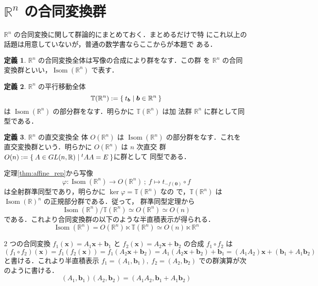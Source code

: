 \documentclass[11pt, uplatex, dvipdfmx, titlepage]{jsarticle}
\DeclareMathOperator{\Isom}{Isom}
\theoremstyle{definition}
\newtheorem*{definition}{定義}
\begin{document}
\section{$\mathbb{R}^n$ の合同変換群}\label{sec:orthogonal}

$\mathbb{R}^n$ の合同変換に関して群論的にまとめておく．まとめるだけで特
にこれ以上の話題は用意していないが，普通の数学書ならここからが本題で
ある．

\begin{definition}
  $\mathbb{R}^n$ の合同変換全体は写像の合成により群をなす．この群
  を $\mathbb{R}^n$ の合同変換群といい，$\Isom(\mathbb{R}^n)$ で表す．
\end{definition}

\begin{definition}
  $\mathbb{R}^n$ の平行移動全体
  \[
    \mathbb{T}(\mathbb{R}^n):=\Set{ t_{\bm{b}} | \bm{b} \in \mathbb{R}^n}
  \]
  は $\Isom(\mathbb{R}^n)$ の部分群をなす．明らかに $\mathbb{T}(\mathbb{R}^n)$ は加
  法群 $\mathbb{R}^n$ に群として同型である．
\end{definition}

\begin{definition}
  $\mathbb{R}^n$ の直交変換全
  体 $O(\mathbb{R}^n)$ は $\Isom(\mathbb{R}^n)$ の部分群をなす．これを
  直交変換群という．明らかに $O(\mathbb{R}^n)$ は $n$ 次直交
  群 $O(n):=\Set{ A \in GL(n,\mathbb{R}) | {}^{t}A A = E}$に群として
  同型である．
\end{definition}


定理\ref{thm:affine_rep}から写像
\[
  \varphi : \Isom(\mathbb{R}^n) \to O(\mathbb{R}^n) \ ; \ f \mapsto t_{-f(\bm{0})} \circ f 
\]
は全射群準同型であり，明らかに $\ker \varphi = \mathbb{T}(\mathbb{R}^n)$ なの
で，$\mathbb{T}(\mathbb{R}^n)$ は $\Isom(\mathbb{R})^n$ の正規部分群である．従って，
群準同型定理から
\[
  \Isom(\mathbb{R}^n)/\mathbb{T}(\mathbb{R}^n) \simeq O(\mathbb{R}^n) \simeq O(n)
\]
である．これより合同変換群の以下のような半直積表示が得られる．
\[
  \Isom(\mathbb{R}^n) = O(\mathbb{R}^n)  \ltimes \mathbb{T}(\mathbb{R}^n) \simeq O(n)\ltimes \mathbb{R}^n
\]

$2$ つの合同変換
$f_1(\bm{x}) = A_1 \bm{x} + \bm{b}_1$ と $f_2(\bm{x}) = A_2 \bm{x} +
\bm{b}_2$ の合成 $f_1 \circ f_2$ は
\[
  \left(f_1 \circ f_2 \right)(\bm{x}) =  f_1\left( f_2\left( \bm{x}\right)\right)
  = f_1\left(A_2\bm{x}+\bm{b}_2\right) = A_1\left(A_2\bm{x} + \bm{b}_2\right) + \bm{b}_1
  = \left( A_1 A_2\right) \bm{x} + \left( \bm{b}_1 + A_1 \bm{b}_2\right)
\]
と書ける．これより半直積表示 $f_1 = (A_1, \bm{b}_1), \; f_2 = (A_2,
\bm{b}_2)$ での群演算が次のように書ける．
\[
  \left(A_1, \bm{b}_1\right)  \left( A_2, \bm{b}_2\right) = \left( A_1 A_2, \bm{b}_1 + A_1 \bm{b}_2\right)
\]
\end{document}
